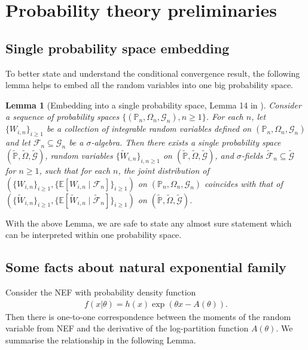 \documentclass[12pt]{article}
\newtheorem{lemma}{Lemma}
\theoremstyle{definition}
\def\P{\mathbb{P}}
\def\P{\mathbb{P}}
\newcommand{\E}{\mathbb E}								%
\renewcommand{\P}{\mathbb{P}}							%
\begin{document}
\section{Probability theory preliminaries}

\subsection{Single probability space embedding}
To better state and understand the conditional convergence result, the following lemma helps to embed all the random variables into one big probability space.

\begin{lemma}[Embedding into a single probability space, Lemma 14 in \cite{Niu2022a}]\label{lem:embedding}
	Consider a sequence of probability spaces $\{(\P_n,\Omega_n,\mathcal{G}_n),n \geq 1\}$. For each $n$, let $\{W_{i,n}\}_{i \geq 1}$ be a collection of integrable random variables defined on $(\P_n,\Omega_n,\mathcal{G}_n)$ and let $\mathcal F_n \subseteq \mathcal G_n$ be a $\sigma$-algebra. Then there exists a single probability space $(\widetilde{\P}, \widetilde{\Omega}, \widetilde{\mathcal G})$, random variables $\{\widetilde W_{i,n}\}_{i,n \geq 1}$ on $(\widetilde{\P}, \widetilde{\Omega}, \widetilde{\mathcal G})$, and $\sigma$-fields $\widetilde{\mathcal F}_n \subseteq \widetilde{\mathcal G}$ for $n \geq 1$, such that for each $n$, the joint distribution of $(\{W_{i,n}\}_{i \geq 1}, \{\E[W_{i,n}\mid\mathcal F_n]\}_{i \geq 1})$ on $(\P_n,\Omega_n,\mathcal{G}_n)$ coincides with that of $(\{\widetilde W_{i,n}\}_{i \geq 1}, \{\E[\widetilde W_{i,n}\mid \widetilde{\mathcal F}_n]\}_{i \geq 1})$ on $(\widetilde{\P}, \widetilde{\Omega}, \widetilde{\mathcal G})$.
\end{lemma}
\noindent With the above Lemma, we are safe to state any almost sure statement which can be interpreted within one probability space. 

\subsection{Some facts about natural exponential family}

Consider the NEF with probability density function
\begin{align*}
  f(x|\theta)=h(x)\exp(\theta x-A(\theta)).
\end{align*}
Then there is one-to-one correspondence between the moments of the random variable from NEF and the derivative of the log-partition function $A(\theta)$. We summarise the relationship in the following Lemma.
\end{document}
